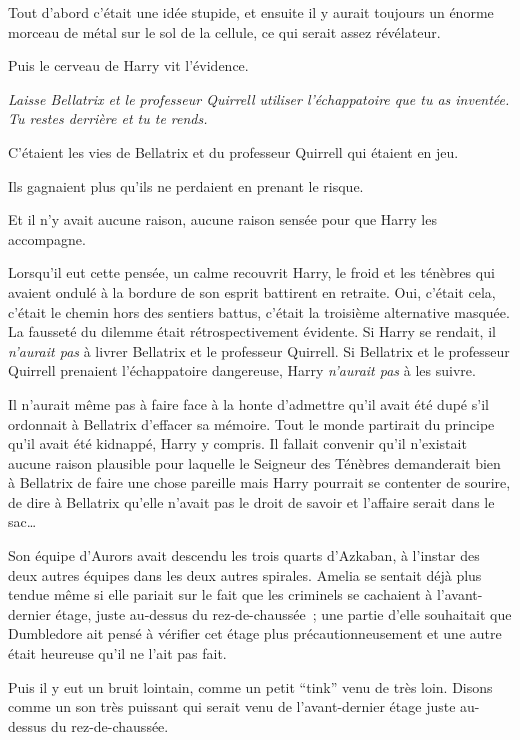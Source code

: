 Tout d'abord c'était une idée stupide, et ensuite il y aurait toujours un énorme morceau de métal sur le sol de la cellule, ce qui serait assez révélateur.

Puis le cerveau de Harry vit l'évidence.

\emph{Laisse Bellatrix et le professeur Quirrell utiliser l'échappatoire que tu as inventée.
Tu restes derrière et tu te rends.}

C'étaient les vies de Bellatrix et du professeur Quirrell qui étaient en jeu.

Ils gagnaient plus qu'ils ne perdaient en prenant le risque.

Et il n'y avait aucune raison, aucune raison sensée pour que Harry les accompagne.

Lorsqu'il eut cette pensée, un calme recouvrit Harry, le froid et les ténèbres qui avaient ondulé à la bordure de son esprit battirent en retraite.
Oui, c'était cela, c'était le chemin hors des sentiers battus, c'était la troisième alternative masquée.
La fausseté du dilemme était rétrospectivement évidente.
Si Harry se rendait, il \emph{n'aurait pas} à livrer Bellatrix et le professeur Quirrell.
Si Bellatrix et le professeur Quirrell prenaient l'échappatoire dangereuse, Harry \emph{n'aurait pas} à les suivre.

Il n'aurait même pas à faire face à la honte d'admettre qu'il avait été dupé s'il ordonnait à Bellatrix d'effacer sa mémoire.
Tout le monde partirait du principe qu'il avait été kidnappé, Harry y compris.
Il fallait convenir qu'il n'existait aucune raison plausible pour laquelle le Seigneur des Ténèbres demanderait bien à Bellatrix de faire une chose pareille mais Harry pourrait se contenter de sourire, de dire à Bellatrix qu'elle n'avait pas le droit de savoir et l'affaire serait dans le sac…

\later

Son équipe d'Aurors avait descendu les trois quarts d'Azkaban, à l'instar des deux autres équipes dans les deux autres spirales.
Amelia se sentait déjà plus tendue même si elle pariait sur le fait que les criminels se cachaient à l'avant-dernier étage, juste au-dessus du rez-de-chaussée~; une partie d'elle souhaitait que Dumbledore ait pensé à vérifier cet étage plus précautionneusement et une autre était heureuse qu'il ne l'ait pas fait.

Puis il y eut un bruit lointain, comme un petit “tink” venu de très loin.
Disons comme un son très puissant qui serait venu de l'avant-dernier étage juste au-dessus du rez-de-chaussée.

